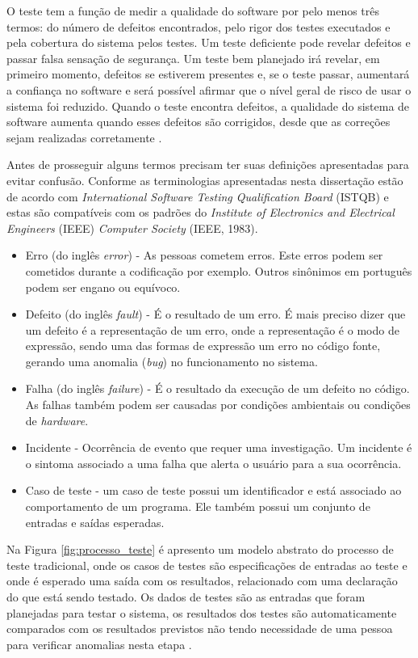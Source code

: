 O teste tem a função de medir a qualidade do software por pelo menos três termos: do número de defeitos encontrados, pelo rigor dos testes executados e pela cobertura do sistema pelos testes. Um teste deficiente pode revelar defeitos e passar falsa sensação de segurança. Um teste bem planejado irá revelar, em primeiro momento, defeitos se estiverem presentes e, se o teste passar, aumentará a confiança no software e será possível afirmar que o nível geral de risco de usar o sistema foi reduzido. Quando o teste encontra defeitos, a qualidade do sistema de software aumenta quando esses defeitos são corrigidos, desde que as correções sejam realizadas corretamente \cite{graham2008foundations}.


Antes de prosseguir alguns termos precisam ter suas definições apresentadas para evitar confusão. Conforme \cite{jorgensen2016software} as terminologias apresentadas nesta dissertação estão de acordo com \textit{International Software Testing Qualification Board} (ISTQB) e estas são compatíveis com os padrões do \textit{Institute of Electronics and Electrical Engineers} (IEEE) \textit{Computer Society} (IEEE, 1983).

\begin{itemize}
\item Erro (do inglês \textit{error}) - As pessoas cometem erros. Este erros podem ser cometidos durante a codificação por exemplo. Outros sinônimos em português podem ser engano ou equívoco.
\item Defeito (do inglês \textit{fault}) -  É o resultado de um erro. É mais preciso dizer que um defeito é a representação de um erro, onde a representação é o modo de expressão, sendo uma das formas de expressão um erro no código fonte, gerando uma anomalia (\textit{bug}) no funcionamento no sistema.
\item Falha (do inglês \textit{failure}) - É o resultado da execução de um defeito no código. As falhas também podem ser causadas por condições ambientais ou condições de \textit{hardware}.
\item Incidente - Ocorrência de evento que requer uma investigação. Um incidente é o sintoma associado a uma falha que alerta o usuário para a sua ocorrência.
\item Caso de teste - um caso de teste possui um identificador e está associado ao comportamento de um programa. Ele também possui um conjunto de entradas e saídas esperadas.
\end{itemize}

Na Figura \ref{fig:processo_teste} é apresento um modelo abstrato do processo de teste tradicional, onde os casos de testes são especificações de entradas ao teste e onde é esperado uma saída com os resultados,  relacionado com uma declaração do que está sendo testado. Os dados de testes são as entradas que foram planejadas para testar o sistema, os resultados dos testes são automaticamente comparados com os resultados previstos não tendo necessidade de uma pessoa para verificar anomalias nesta etapa \cite{sommerville2010}.

